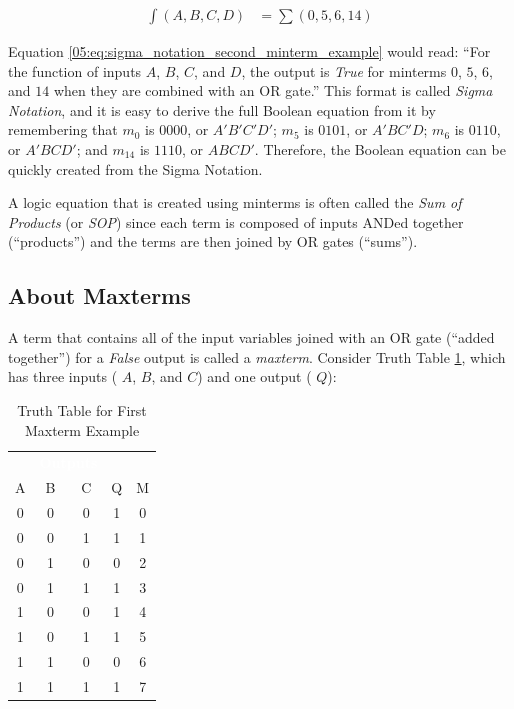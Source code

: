 \begin{align}
  \label{05:eq:sigma_notation_second_minterm_example}
  \int(A,B,C,D) &= \sum(0,5,6,14)
\end{align}

Equation \ref{05:eq:sigma_notation_second_minterm_example} would read: ``For the function of inputs  $ A $,  $ B $,  $ C $, and  $ D $, the output is \emph{True} for minterms $ 0 $, $ 5 $, $ 6 $, and $ 14 $ when they are combined with an \textsf{OR}  gate.'' This format is called \emph{Sigma Notation}, and it is easy to derive the full Boolean equation from it by remembering that $ m_0 $ is $ 0000 $, or $ A'B'C'D' $; $ m_5 $ is $ 0101 $, or $ A'BC'D $; $ m_6 $ is $ 0110 $, or $ A'BCD' $; and $ m_{14} $ is $ 1110 $, or $ ABCD' $. Therefore, the Boolean equation can be quickly created from the Sigma Notation. 

A logic equation that is created using minterms is often called the \emph{Sum of Products} (or \emph{SOP}) since each term is composed of inputs \textsf{AND}ed together (``products'') and the terms are then joined by \textsf{OR} gates (``sums'').

\subsection{About Maxterms}
\label{05:subsec:about_maxterms}

A term that contains all of the input variables joined with an \textsf{OR} gate (``added together'') for a \emph{False} output is called a \emph{maxterm}. Consider Truth Table \ref{05:tab:truth_table_for_first_maxterm_example}, which has three inputs ( $ A $,  $ B $, and  $ C $) and one output ( $ Q $): 

\begin{table}[H]
  \sffamily
  \newcommand{\head}[1]{\textcolor{white}{\textbf{#1}}}    
  \begin{center}
    \begin{tabular}{ccc|cc} 
      \rowcolor{black!75}
      \multicolumn{3}{c}{\head{Inputs}} & \multicolumn{2}{c}{\head{Outputs}} \\
      A & B & C & Q & M \\
      \hline
      0 & 0 & 0 & 1 & 0 \\
      0 & 0 & 1 & 1 & 1 \\
      0 & 1 & 0 & 0 & 2 \\
      0 & 1 & 1 & 1 & 3 \\
      1 & 0 & 0 & 1 & 4 \\
      1 & 0 & 1 & 1 & 5 \\
      1 & 1 & 0 & 0 & 6 \\
      1 & 1 & 1 & 1 & 7 
    \end{tabular}
  \end{center}
  \caption{Truth Table for First Maxterm Example}
  \label{05:tab:truth_table_for_first_maxterm_example}
\end{table}

